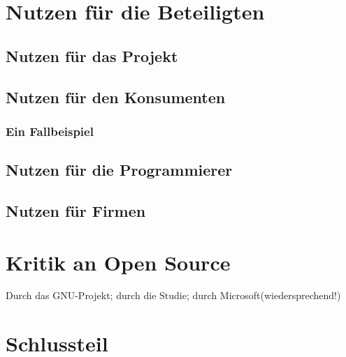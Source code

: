 \documentclass[a4paper,12pt]{article}
\begin{document}
\section{Nutzen für die Beteiligten}%
\subsection{Nutzen für das Projekt}
\subsection{Nutzen für den Konsumenten}%
\subsubsection{Ein Fallbeispiel}%
\subsection{Nutzen für die Programmierer}%
\subsection{Nutzen für Firmen}%
\section{Kritik an Open Source}%
Durch das GNU-Projekt; durch die Studie; durch Microsoft(wiedersprechend!)
\section{Schlussteil} %
\newpage
{}
\end{document}
